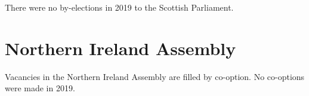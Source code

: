\documentclass[a4paper,openany]{book}
\begin{document}
There were no by-elections in 2019 to the Scottish Parliament.
%
%
%
%
%
%
%

\section{Northern Ireland Assembly}

Vacancies in the Northern Ireland Assembly are filled by co-option.
No co-options were made in 2019.
%
\end{document}
